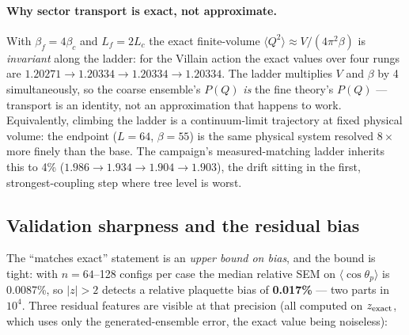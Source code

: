 \paragraph{Why sector transport is exact, not approximate.} With
$\beta_f = 4\beta_c$ and $L_f = 2L_c$ the exact finite-volume
$\langle Q^2 \rangle \approx V/(4\pi^2\beta)$ is \emph{invariant} along the
ladder: for the Villain action the exact values over four rungs are
$1.20271 \to 1.20334 \to 1.20334 \to 1.20334$. The ladder multiplies $V$ and
$\beta$ by 4 simultaneously, so the coarse ensemble's $P(Q)$ \emph{is} the
fine theory's $P(Q)$ --- transport is an identity, not an approximation that
happens to work. Equivalently, climbing the ladder is a continuum-limit
trajectory at fixed physical volume: the endpoint ($L = 64$, $\beta = 55$)
is the same physical system resolved $8\times$ more finely than the base.
The campaign's measured-matching ladder inherits this to 4\%
($1.986 \to 1.934 \to 1.904 \to 1.903$), the drift sitting in the first,
strongest-coupling step where tree level is worst.

\subsection{Validation sharpness and the residual bias}
\label{sec:appendix-v2-sharpness}

The ``matches exact'' statement is an \emph{upper bound on bias}, and the
bound is tight: with $n = 64$--128 configs per case the median relative SEM
on $\langle \cos\theta_p \rangle$ is 0.0087\%, so $|z| > 2$ detects a
relative plaquette bias of \textbf{0.017\%} --- two parts in $10^4$. Three
residual features are visible at that precision (all computed on
$z_{\rm exact}$, which uses only the generated-ensemble error, the exact
value being noiseless):

